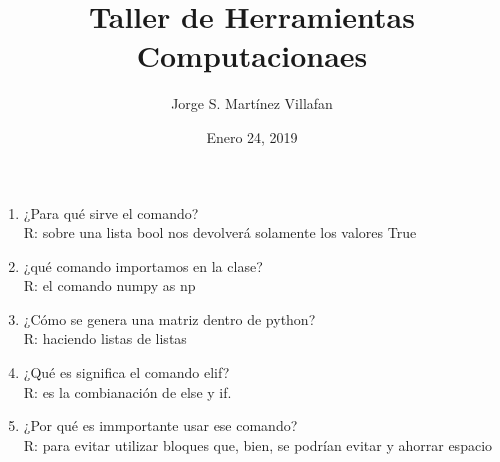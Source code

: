 \documentclass[letterpaper, 12pt, oneside]{article}%
\title{\Huge Taller de Herramientas Computacionaes}
\author{Jorge S. Martínez Villafan}
\date{Enero 24, 2019}
\begin{document}
\begin{enumerate}
\item ¿Para qué sirve el comando?\\
R: \color{red} sobre una lista bool nos devolverá solamente los valores True \color{black} 
\item ¿qué comando importamos en la clase?\\
R: \color{red} el comando numpy as np \color{black}
\item ¿Cómo se genera una matriz dentro de python?\\
R: \color{red} haciendo listas de listas \color{black}
\item ¿Qué es significa el comando elif?\\
R: \color{red} es la combianación de else y if. \color{black}
\item ¿Por qué es immportante usar ese comando?\\
R: \color{red} para evitar utilizar bloques que, bien, se podrían evitar y ahorrar espacio \color{black}

\end{enumerate}
\end{document}
